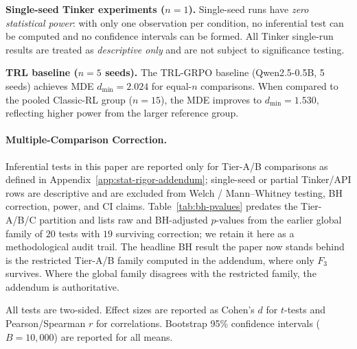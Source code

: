 \documentclass{article}
\begin{document}
\textbf{Single-seed Tinker experiments ($n = 1$).}
Single-seed runs have \emph{zero statistical power}: with only one observation per
condition, no inferential test can be computed and no confidence intervals can be
formed.  All Tinker single-run results are treated as \emph{descriptive only} and
are not subject to significance testing.

\textbf{TRL baseline ($n = 5$ seeds).}
The TRL-GRPO baseline (Qwen2.5-0.5B, 5 seeds) achieves MDE
$d_{\min} = 2.024$ for equal-$n$ comparisons.
When compared to the pooled Classic-RL group ($n = 15$), the MDE
improves to $d_{\min} = 1.530$,
reflecting higher power from the larger reference group.

\paragraph{Multiple-Comparison Correction.}
Inferential tests in this paper are reported only for Tier-A/B
comparisons as defined in Appendix~\ref{app:stat-rigor-addendum};
single-seed or partial Tinker/API rows are descriptive and are
excluded from Welch / Mann--Whitney testing, BH correction, power,
and CI claims. Table~\ref{tab:bh-pvalues} predates the Tier-A/B/C
partition and lists raw and BH-adjusted $p$-values from the
earlier global family of $20$ tests with $19$ surviving correction;
we retain it here as a methodological audit trail. The headline
BH result the paper now stands behind is the restricted Tier-A/B
family computed in the addendum, where only $F_3$ survives. Where
the global family disagrees with the restricted family, the
addendum is authoritative.

All tests are two-sided.  Effect sizes are reported as Cohen's $d$ for
$t$-tests and Pearson/Spearman $r$ for correlations.  Bootstrap 95\%
confidence intervals ($B = 10{,}000$) are reported for all means.
\end{document}
